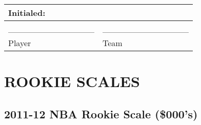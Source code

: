 \documentclass[
]{book}
\begin{document}
\begin{longtable}[]{@{}ll@{}}
\toprule()
Initialed: & \\
\midrule()
\endhead
\_\_\_\_\_\_\_\_\_\_\_\_\_\_ & \_\_\_\_\_\_\_\_\_\_\_\_\_\_ \\
Player & Team \\
\bottomrule()
\end{longtable}

\hypertarget{rookie-scales}{%
\chapter{ROOKIE SCALES}\label{rookie-scales}}

\newpage

\hypertarget{nba-rookie-scale-000s}{%
\section{2011-12 NBA Rookie Scale (\$000's)}\label{nba-rookie-scale-000s}}
\end{document}
